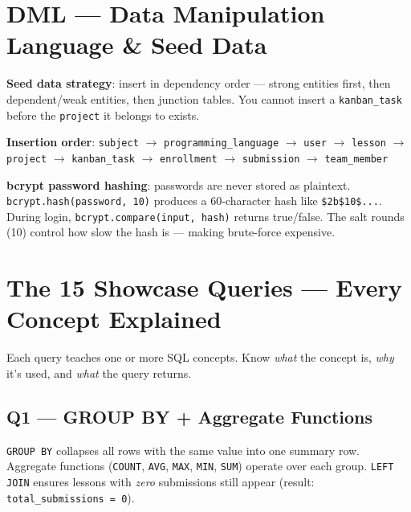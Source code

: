 \documentclass[11pt,a4paper]{article}
\newcommand{\T}[1]{\texttt{#1}}          %
\begin{document}
\section{DML --- Data Manipulation Language \& Seed Data}

\begin{defbox}
\textbf{Seed data strategy}: insert in dependency order — strong entities first, then
dependent/weak entities, then junction tables. You cannot insert a \T{kanban\_task}
before the \T{project} it belongs to exists.
\end{defbox}

\textbf{Insertion order}: \T{subject} $\to$ \T{programming\_language} $\to$ \T{user} $\to$ \T{lesson}
$\to$ \T{project} $\to$ \T{kanban\_task} $\to$ \T{enrollment} $\to$ \T{submission} $\to$ \T{team\_member}

\textbf{bcrypt password hashing}: passwords are never stored as plaintext.
\T{bcrypt.hash(password, 10)} produces a 60-character hash like
\T{\$2b\$10\$...}. During login, \T{bcrypt.compare(input, hash)} returns
true/false. The salt rounds (10) control how slow the hash is — making brute-force
expensive.

\section{The 15 Showcase Queries --- Every Concept Explained}

Each query teaches one or more SQL concepts. Know \textit{what} the concept is,
\textit{why} it's used, and \textit{what} the query returns.

\subsection{Q1 — GROUP BY + Aggregate Functions}

\begin{defbox}
\T{GROUP BY} collapses all rows with the same value into one summary row. Aggregate
functions (\T{COUNT}, \T{AVG}, \T{MAX}, \T{MIN}, \T{SUM}) operate over each group.
\T{LEFT JOIN} ensures lessons with \textit{zero} submissions still appear (result:
\T{total\_submissions = 0}).
\end{defbox}
\end{document}

